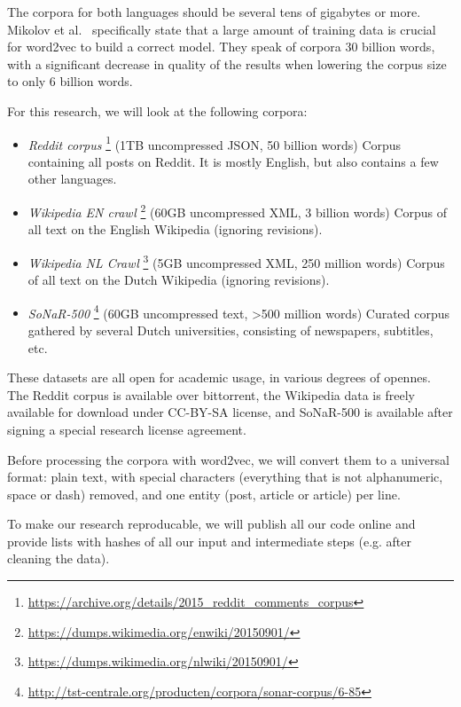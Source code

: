 The corpora for both languages should be several tens of gigabytes or more. Mikolov et al.~\cite{mikolov2013distributed} specifically state that a large amount of training data is crucial for word2vec to build a correct model. They speak of corpora 30 billion words, with a significant decrease in quality of the results when lowering the corpus size to only 6 billion words.

For this research, we will look at the following corpora:
\begin{itemize}
  \item \textit{Reddit corpus}
    \footnote{\url{https://archive.org/details/2015_reddit_comments_corpus}}
    (1TB uncompressed JSON, 50 billion words) Corpus containing all posts on Reddit. It is mostly English, but also contains a few other languages.
  \item \textit{Wikipedia EN crawl} 
    \footnote{\url{https://dumps.wikimedia.org/enwiki/20150901/}}
    (60GB uncompressed XML, 3 billion words) Corpus of all text on the English Wikipedia (ignoring revisions).
  \item \textit{Wikipedia NL Crawl} 
    \footnote{\url{https://dumps.wikimedia.org/nlwiki/20150901/}}
    (5GB uncompressed XML, 250 million words) Corpus of all text on the Dutch Wikipedia (ignoring revisions).
  \item \textit{SoNaR-500} 
    \footnote{\url{http://tst-centrale.org/producten/corpora/sonar-corpus/6-85}}
    (60GB uncompressed text, >500 million words) Curated corpus gathered by several Dutch universities, consisting of newspapers, subtitles, etc.
\end{itemize}

These datasets are all open for academic usage, in various degrees of opennes. The Reddit corpus is available over bittorrent, the Wikipedia data is freely available for download under CC-BY-SA license, and SoNaR-500 is available after signing a special research license agreement.

Before processing the corpora with word2vec, we will convert them to a universal format: plain text, with special characters (everything that is not alphanumeric, space or dash) removed, and one entity (post, article or article) per line.

To make our research reproducable, we will publish all our code online and provide lists with hashes of all our input and intermediate steps (e.g. after cleaning the data).